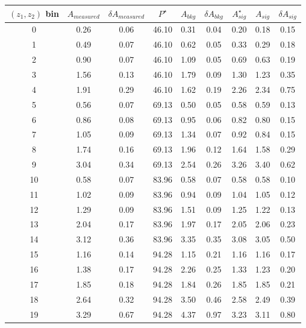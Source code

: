 \begin{table}[H]\footnotesize
\centering
\begin{tabular}{|c|c|c|c|c|c|c|c|c|}
 \hline
$(z_1,z_2)$ bin & $A_{measured}$ & $\delta A_{measured}$ & $P^{\star}$ &  $A_{bkg}$ & $\delta A_{bkg}$ & $A_{sig}^{\star}$ & $ A_{sig}$  & $\delta A_{sig}$ \\ \hline\hline
0 & 0.26 & 0.06 & 46.10 & 0.31 & 0.04 & 0.20 & 0.18 & 0.15 \\ \hline 
1 & 0.49 & 0.07 & 46.10 & 0.62 & 0.05 & 0.33 & 0.29 & 0.18 \\ \hline 
2 & 0.90 & 0.07 & 46.10 & 1.09 & 0.05 & 0.69 & 0.63 & 0.19 \\ \hline 
3 & 1.56 & 0.13 & 46.10 & 1.79 & 0.09 & 1.30 & 1.23 & 0.35 \\ \hline 
4 & 1.91 & 0.29 & 46.10 & 1.62 & 0.19 & 2.26 & 2.34 & 0.75 \\ \hline 
\hline
5 & 0.56 & 0.07 & 69.13 & 0.50 & 0.05 & 0.58 & 0.59 & 0.13 \\ \hline 
6 & 0.86 & 0.08 & 69.13 & 0.95 & 0.06 & 0.82 & 0.80 & 0.15 \\ \hline 
7 & 1.05 & 0.09 & 69.13 & 1.34 & 0.07 & 0.92 & 0.84 & 0.15 \\ \hline 
8 & 1.74 & 0.16 & 69.13 & 1.96 & 0.12 & 1.64 & 1.58 & 0.29 \\ \hline 
9 & 3.04 & 0.34 & 69.13 & 2.54 & 0.26 & 3.26 & 3.40 & 0.62 \\ \hline 
\hline
10 & 0.58 & 0.07 & 83.96 & 0.58 & 0.07 & 0.58 & 0.58 & 0.10 \\ \hline 
11 & 1.02 & 0.09 & 83.96 & 0.94 & 0.09 & 1.04 & 1.05 & 0.12 \\ \hline 
12 & 1.29 & 0.09 & 83.96 & 1.51 & 0.09 & 1.25 & 1.22 & 0.13 \\ \hline 
13 & 2.04 & 0.17 & 83.96 & 1.97 & 0.17 & 2.05 & 2.06 & 0.23 \\ \hline 
14 & 3.12 & 0.36 & 83.96 & 3.35 & 0.35 & 3.08 & 3.05 & 0.50 \\ \hline 
\hline
15 & 1.16 & 0.14 & 94.28 & 1.15 & 0.21 & 1.16 & 1.16 & 0.17 \\ \hline 
16 & 1.38 & 0.17 & 94.28 & 2.26 & 0.25 & 1.33 & 1.23 & 0.20 \\ \hline 
17 & 1.85 & 0.18 & 94.28 & 1.84 & 0.26 & 1.85 & 1.85 & 0.21 \\ \hline 
18 & 2.64 & 0.32 & 94.28 & 3.50 & 0.46 & 2.58 & 2.49 & 0.39 \\ \hline 
19 & 3.29 & 0.67 & 94.28 & 4.37 & 0.97 & 3.23 & 3.11 & 0.80 \\ \hline 

\end{tabular}
\end{table}
